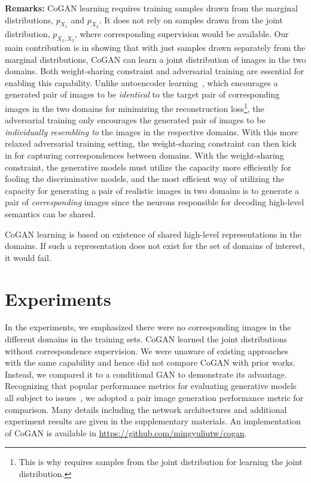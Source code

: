 \documentclass{article}
\begin{document}
{\bf Remarks:} CoGAN learning requires training samples drawn from the marginal distributions, $p_{X_1}$ and $p_{X_2}$. It does not rely on samples drawn from the joint distribution, $p_{X_1,X_2}$, where corresponding supervision would be available. Our main contribution is in showing that with just samples drawn separately from the marginal distributions, CoGAN can learn a joint distribution of images in the two domains. Both weight-sharing constraint and adversarial training are essential for enabling this capability. Unlike autoencoder learning~\cite{ngiam2011multimodal}, which encourages a generated pair of images to be {\it identical} to the target pair of corresponding images in the two domains for minimizing the reconstruction loss\footnote{This is why \cite{ngiam2011multimodal} requires samples from the joint distribution for learning the joint distribution.}, the adversarial training only encourages the generated pair of images to be {\it individually resembling to} the images in the respective domains. With this more relaxed adversarial training setting, the weight-sharing constraint can then kick in for capturing correspondences between domains. With the weight-sharing constraint, the generative models must utilize the capacity more efficiently for fooling the discriminative models, and the most efficient way of utilizing the capacity for generating a pair of realistic images in two domains is to generate a pair of {\it corresponding} images since the neurons responsible for decoding high-level semantics can be shared. 

CoGAN learning is based on existence of shared high-level representations in the domains. If such a representation does not exist for the set of domains of interest, it would fail.
 \section{Experiments}\label{sec::expr}

In the experiments, we emphasized there were no corresponding images in the different domains in the training sets. CoGAN learned the joint distributions without correspondence supervision. We were unaware of existing approaches with the same capability and hence did not compare CoGAN with prior works. Instead, we compared it to a conditional GAN to demonstrate its advantage. Recognizing that popular performance metrics for evaluating generative models all subject to issues~\cite{theis2015note}, we adopted a pair image generation performance metric for comparison. Many details including the network architectures and additional experiment results are given in the supplementary materials. An implementation of CoGAN is available in \url{https://github.com/mingyuliutw/cogan}. 
\end{document}
